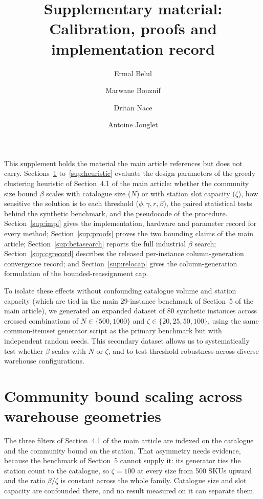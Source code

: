 \documentclass[11pt]{article}
\title{Supplementary material:\\
Calibration, proofs and implementation record}
\author{Ermal Belul \and Marwane Bouznif \and Dritan Nace \and Antoine Jouglet}
\date{}
\begin{document}
\maketitle

\noindent
This supplement holds the material the main article references but does not carry.
Sections~\ref{sup:capsweep} to~\ref{sup:heuristic} evaluate the design parameters of the greedy
clustering heuristic of Section~4.1 of the main article: whether the community size bound $\beta$
scales with catalogue size ($N$) or with station slot capacity ($\zeta$), how sensitive the
solution is to each threshold ($\phi, \gamma, r, \beta$), the paired statistical tests behind the
synthetic benchmark, and the pseudocode of the procedure. Section~\ref{sup:impl} gives the
implementation, hardware and parameter record for every method; Section~\ref{sup:proofs} proves
the two bounding claims of the main article; Section~\ref{sup:betasearch} reports the full
industrial $\beta$ search; Section~\ref{sup:cgrecord} describes the released per-instance
column-generation convergence record; and Section~\ref{sup:relocap} gives the column-generation
formulation of the bounded-reassignment cap.

To isolate these effects without confounding catalogue volume and station capacity (which are
tied in the main 29-instance benchmark of Section~5 of the main article), we generated an
expanded dataset of 80 synthetic instances across crossed combinations of $N \in \{500, 1000\}$
and $\zeta \in \{20, 25, 50, 100\}$, using the same common-itemset generator script as the
primary benchmark but with independent random seeds. This secondary dataset allows us to
systematically test whether $\beta$ scales with $N$ or $\zeta$, and to test threshold
robustness across diverse warehouse configurations.

\section{Community bound scaling across warehouse geometries}\label{sup:capsweep}
The three filters of Section~4.1 of the main article are indexed on the catalogue and the
community bound on the station. That asymmetry needs evidence, because the benchmark of
Section~5 cannot supply it: its generator ties the station count to the catalogue, so
$\zeta=100$ at every size from 500 SKUs upward and the ratio $\beta/\zeta$ is constant across
the whole family. Catalogue size and slot capacity are confounded there, and no result measured
on it can separate them.
\end{document}
